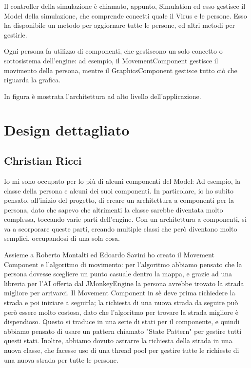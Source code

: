 Il controller della simulazione è chiamato, appunto, Simulation ed esso gestisce il Model della simulazione, che comprende concetti quale il Virus e le persone. Esso ha disponibile un metodo per aggiornare tutte le persone, ed altri metodi per gestirle.

Ogni persona fa utilizzo di componenti, che gestiscono un solo concetto o sottosistema dell'engine: ad esempio, il MovementComponent gestisce il movimento della persona, mentre il GraphicsComponent gestisce tutto ciò che riguarda la grafica.

In figura è mostrata l'architettura ad alto livello dell'applicazione.


\section{Design dettagliato}

\subsection{Christian Ricci}

Io mi sono occupato per lo più di alcuni componenti del Model: Ad esempio, la classe della persona e alcuni dei suoi componenti. In particolare, io ho subito pensato, all'inizio del progetto, di creare un architettura a componenti per la persona, dato che sapevo che altrimenti la classe sarebbe diventata molto complessa, toccando varie parti dell'engine. Con un architettura a componenti, si va a scorporare queste parti, creando multiple classi che però diventano molto semplici, occupandosi di una sola cosa.

Assieme a Roberto Montalti ed Edoardo Savini ho creato il Movement Component e l'algoritmo di movimento: per l'algoritmo abbiamo pensato che la persona dovesse scegliere un punto casuale dentro la mappa, e grazie ad una libreria per l'AI offerta dal JMonkeyEngine la persona avrebbe trovato la strada migliore per arrivarci. Il Movement Component in sè deve prima richiedere la strada e poi iniziare a seguirla; la richiesta di una nuova strada da seguire può però essere molto costosa, dato che l'algoritmo per trovare la strada migliore è dispendioso. Questo si traduce in una serie di stati per il componente, e quindi abbiamo pensato di usare un pattern chiamato "State Pattern" per gestire tutti questi stati. Inoltre, abbiamo dovuto astrarre la richiesta della strada in una nuova classe, che facesse uso di una thread pool per gestire tutte le richieste di una nuova strada per tutte le persone.


